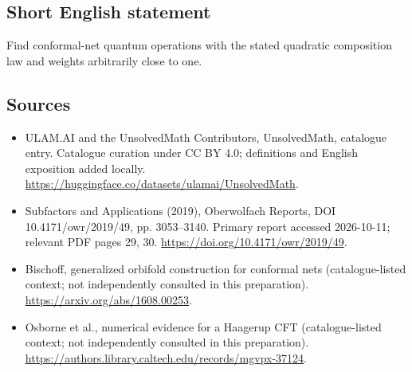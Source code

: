 \documentclass[11pt]{article}
\begin{document}
\subsection{Short English statement}
Find conformal-net quantum operations with the stated quadratic composition law and weights arbitrarily close to one.
\subsection{Sources}
\begin{itemize}
\item[\hypertarget{source:statement:1}{S1}] ULAM.AI and the UnsolvedMath Contributors, UnsolvedMath, catalogue entry. Catalogue curation under CC BY 4.0; definitions and English exposition added locally.
\url{https://huggingface.co/datasets/ulamai/UnsolvedMath}.
\item[\hypertarget{source:statement:2}{S2}] Subfactors and Applications (2019), Oberwolfach Reports, DOI 10.4171/owr/2019/49, pp. 3053--3140. Primary report accessed 2026-10-11; relevant PDF pages 29, 30.
\url{https://doi.org/10.4171/owr/2019/49}.
\item[\hypertarget{source:statement:3}{S3}] Bischoff, generalized orbifold construction for conformal nets (catalogue-listed context; not independently consulted in this preparation).
\url{https://arxiv.org/abs/1608.00253}.
\item[\hypertarget{source:statement:4}{S4}] Osborne et al., numerical evidence for a Haagerup CFT (catalogue-listed context; not independently consulted in this preparation).
\url{https://authors.library.caltech.edu/records/mgvpx-37124}.
\end{itemize}
\label{end:statement}
\end{document}
